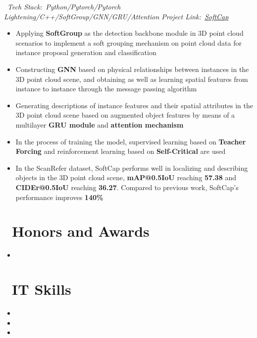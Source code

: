 \documentclass{resume}
\begin{document}
\ \textit{Tech Stack:\ Python/Pytorch/Pytorch Lightening/C++/SoftGroup/GNN/GRU/Attention \hfill Project Link:\ \href{https://github.com/LuckyMax0722/SoftCap}{SoftCap}}
\begin{itemize}
  \item Applying \textbf{SoftGroup} as the detection backbone module in 3D point cloud scenarios to implement a soft grouping mechanism on point cloud data for instance proposal generation and classification
  \item Constructing \textbf{GNN} based on physical relationships between instances in the 3D point cloud scene, and obtaining as well as learning spatial features from instance to instance through the message passing algorithm
  \item Generating descriptions of instance features and their spatial attributes in the 3D point cloud scene based on augmented object features by means of a multilayer \textbf{GRU module} and \textbf{attention mechanism}
  \item In the process of training the model, supervised learning based on \textbf{Teacher Forcing} and reinforcement learning based on \textbf{Self-Critical} are used
  \item In the ScanRefer dataset, SoftCap performs well in localizing and describing objects in the 3D point cloud scene, \textbf{mAP@0.5IoU} reaching \textbf{57.38} and \textbf{CIDEr@0.5IoU} reaching \textbf{36.27}. Compared to previous work, SoftCap's performance improves \textbf{140\%}
\end{itemize}

\section{\faStar\ Honors and Awards}
\begin{itemize}
  \item {}
\end{itemize}


\section{\faCogs\ IT Skills}

\begin{itemize}
  \item {}
  \item {}
  \item {}
\end{itemize}
\end{document}
